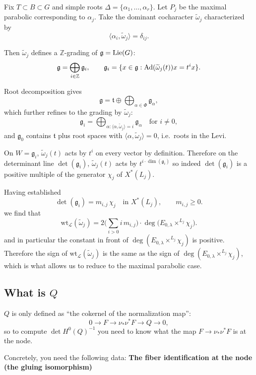 \documentclass[12pt]{article}
\begin{document}
Fix $T\subset B\subset G$ and simple roots $\Delta=\{\alpha_1,\dots,\alpha_r\}$. Let $P_j$ be the maximal parabolic corresponding to $\alpha_j$. Take the dominant cocharacter $\widetilde\omega_j$ characterized by
\[
\langle \alpha_i,\widetilde\omega_j\rangle=\delta_{ij}.
\]

Then $\widetilde\omega_j$ defines a $\mathbb{Z}$-grading of $\mathfrak{g}=\operatorname{Lie}(G)$:
\[
\mathfrak{g}=\bigoplus_{i\in\mathbb{Z}}\mathfrak{g}_i,\qquad
\mathfrak{g}_i=\{x\in\mathfrak{g}:\operatorname{Ad}(\widetilde\omega_j(t))x=t^i x\}.
\]

Root decomposition gives
\[
\mathfrak{g} = \mathfrak{t} \oplus \bigoplus_{\alpha\in\Phi}\mathfrak{g}_\alpha,
\] which further refines to the grading by $\widetilde\omega_j$:
\[
\mathfrak{g}_i = \bigoplus_{\alpha:\langle\alpha,\widetilde\omega_j\rangle=i}\mathfrak{g}_\alpha
\quad\text{for }i\neq 0,
\]
and $\mathfrak{g}_0$ contains $\mathfrak{t}$ plus root spaces with $\langle\alpha,\widetilde\omega_j\rangle=0$, i.e.\ roots in the Levi.

On $W=\mathfrak{g}_i$, $\widetilde\omega_j(t)$ acts by $t^i$ on every vector by definition. Therefore on the determinant line $\det(\mathfrak{g}_i)$,
$\widetilde\omega_j(t)$ acts by $t^{i\cdot \dim(\mathfrak{g}_i)}$ so indeed $\det(\mathfrak{g}_i)$ is a positive multiple of the generator $\chi_j$ of $X^*(L_j)$.

Having established 
\[
\det(\mathfrak{g}_i) = m_{i,j} \, \chi_j
\quad \text{in } X^*(L_j),
\qquad m_{i,j} \ge 0.
\]
we find that
\[
\mathrm{wt}_{\mathcal{L}}(\widetilde{\omega}_j)
=
2\Big(\sum_{i>0} i \, m_{i,j}\Big) \cdot \deg\bigl(E_{0,\lambda} \times^{L_j} \chi_j\bigr).
\]
and in particular the constant in front of $\deg(E_{0,\lambda} \times^{L_j} \chi_j)$ is positive. Therefore the sign of $\mathrm{wt}_{\mathcal{L}}(\widetilde{\omega}_j)$ is the same as the sign of $\deg(E_{0,\lambda} \times^{L_j} \chi_j)$, which is what allows us to reduce to the maximal parabolic case.

\subsection{What is $Q$}

$Q$ is only defined as ``the cokernel of the normalization map'':
\[
0 \to F \to \nu_* \nu^* F \to Q \to 0,
\]
so to compute $\det H^0(Q)^{-1}$ you need to know what the map $F \to \nu_* \nu^* F$ is at the node.

Concretely, you need the following data:
\textbf{The fiber identification at the node (the gluing isomorphism)}
    
\end{document}
